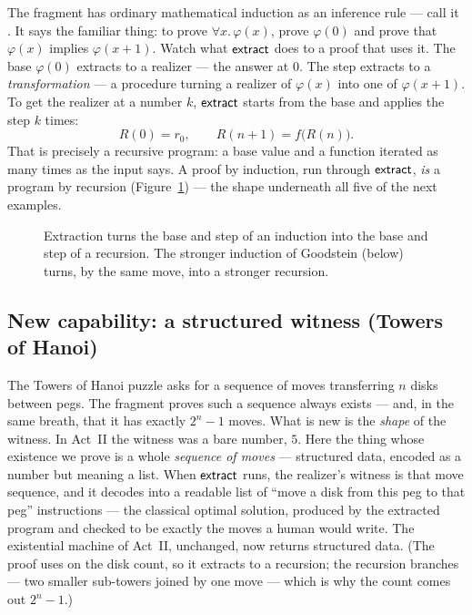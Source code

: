 \documentclass[11pt]{article}
\begin{document}
The fragment has ordinary mathematical induction as an inference rule --- call
it . It says the familiar thing: to prove $\forall x.\,\varphi(x)$,
prove $\varphi(0)$ and prove that $\varphi(x)$ implies $\varphi(x+1)$. Watch
what $\mathsf{extract}$ does to a proof that uses it. The base $\varphi(0)$ extracts
to a realizer --- the answer at $0$. The step extracts to a
\emph{transformation} --- a procedure turning a realizer of $\varphi(x)$ into
one of $\varphi(x+1)$. To get the realizer at a number $k$, $\mathsf{extract}$ starts
from the base and applies the step $k$ times:
\[
  R(0) = r_0, \qquad R(n+1) = f\bigl(R(n)\bigr).
\]
That is precisely a recursive program: a base value and a function iterated as
many times as the input says. A proof by induction, run through $\mathsf{extract}$,
\emph{is} a program by recursion (Figure~\ref{fig:indrec}) --- the shape
underneath all five of the next examples.

\begin{figure}[h]
\centering
{}
\caption{Extraction turns the base and step of an induction into the base and
step of a recursion. The stronger induction of Goodstein (below) turns, by the
same move, into a stronger recursion.}
\label{fig:indrec}
\end{figure}

\subsection*{New capability: a structured witness (Towers of Hanoi)}

The Towers of Hanoi puzzle asks for a sequence of moves transferring $n$ disks
between pegs. The fragment proves such a sequence always exists --- and, in the
same breath, that it has exactly $2^n-1$ moves. What is new is the \emph{shape}
of the witness. In Act~II the witness was a bare number, $5$. Here the thing
whose existence we prove is a whole \emph{sequence of moves} --- structured
data, encoded as a number but meaning a list. When $\mathsf{extract}$ runs, the
realizer's witness is that move sequence, and it decodes into a readable list
of ``move a disk from this peg to that peg'' instructions --- the classical
optimal solution, produced by the extracted program and checked to be exactly
the moves a human would write. The existential machine of Act~II, unchanged,
now returns structured data. (The proof uses  on the disk count, so
it extracts to a recursion; the recursion branches --- two smaller sub-towers
joined by one move --- which is why the count comes out $2^n-1$.)
\end{document}
